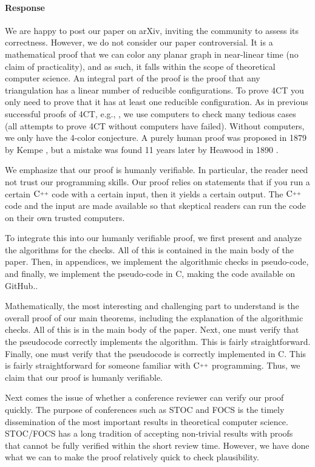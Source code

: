 \documentclass[10pt,a4paper]{article}
\def\Cpp{\textnormal C\raisebox{0.5ex}{\tiny++}}
\begin{document}
{{\color{blue}
\paragraph{Response}

We are happy to post our paper on arXiv, inviting the community to assess its correctness. However, we do not consider our paper controversial. It is a mathematical proof that we can color any planar graph in near-linear time (no claim of practicality), and as such, it falls within the scope of theoretical computer science.  An integral part of the proof is the proof that any triangulation has a linear number of reducible configurations. To prove 4CT you only need to prove that it has at least one reducible configuration. As in previous successful proofs of 4CT, e.g., \cite{AppelHaken89,steinberger2010unavoidable,RSST}, we use computers to check many tedious cases (all attempts to prove 4CT without computers have failed). Without computers, we only have the 4-color conjecture. A purely human proof was proposed in 1879 by Kempe \cite{kempe1879}, but a 
mistake was found 11 years later by Heawood in 1890 \cite{heawood1890}.

We emphasize that our proof is humanly verifiable. In particular, the reader need not trust our programming skills.
Our proof relies on statements that if you run a certain $\Cpp$ code with a certain input, then it yields a certain output. The $\Cpp$ code and the input are made available so that skeptical readers can run the code on their own trusted computers. 

To integrate this into our humanly verifiable proof, we first present and analyze the algorithms for 
the checks. All of this is contained in the main body of the paper. Then, in appendices, we implement the algorithmic checks in pseudo-code, and finally, 
we implement the pseudo-code in \Cpp, making the code available on GitHub..

Mathematically, the most interesting and challenging part to understand is the overall proof of our main theorems, including the explanation of the algorithmic checks. All of this is in the main body of the paper. Next, one must verify that the pseudocode correctly implements the algorithm. This is fairly straightforward. Finally, one must verify that the pseudocode is correctly implemented in \Cpp. This is fairly straightforward for someone familiar with $\Cpp$ programming. Thus, we claim that our proof is humanly verifiable.

Next comes the issue of whether a conference reviewer can verify our proof quickly. The purpose of conferences such as STOC and FOCS is the timely dissemination of the most important results in theoretical computer science. STOC/FOCS has a long tradition of accepting non-trivial results with proofs that cannot be fully verified within the short review time.
However, we have done what we can to make the proof relatively quick to check plausibility.

}}
\end{document}
